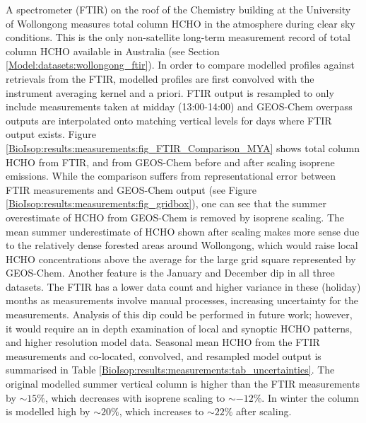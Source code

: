     A spectrometer (FTIR) on the roof of the Chemistry building at the University of Wollongong measures total column HCHO in the atmosphere during clear sky conditions.
    This is the only non-satellite long-term measurement record of total column HCHO available in Australia (see Section \ref{Model:datasets:wollongong_ftir}).
    In order to compare modelled profiles against retrievals from the FTIR, modelled profiles are first convolved with the instrument averaging kernel and a priori. %
    FTIR output is resampled to only include measurements taken at midday (13:00-14:00) and GEOS-Chem overpass outputs are interpolated onto matching vertical levels for days where FTIR output exists.
    Figure \ref{BioIsop:results:measurements:fig_FTIR_Comparison_MYA} shows total column HCHO from FTIR, and from GEOS-Chem before and after scaling isoprene emissions.
    While the comparison suffers from representational error between FTIR measurements and GEOS-Chem output (see Figure \ref{BioIsop:results:measurements:fig_gridbox}), one can see that the summer overestimate of HCHO from GEOS-Chem is removed by isoprene scaling.
    The mean summer underestimate of HCHO shown after scaling makes more sense due to the relatively dense forested areas around Wollongong, which would raise local HCHO concentrations above the average for the large grid square represented by GEOS-Chem.
    Another feature is the January and December dip in all three datasets.
    The FTIR has a lower data count and higher variance in these (holiday) months as measurements involve manual processes, increasing uncertainty for the measurements.
    Analysis of this dip could be performed in future work; however, it would require an in depth examination of local and synoptic HCHO patterns, and higher resolution model data.
    Seasonal mean HCHO from the FTIR measurements and co-located, convolved, and resampled model output is summarised in Table \ref{BioIsop:results:measurements:tab_uncertainties}.
    The original modelled summer vertical column is higher than the FTIR measurements by $\sim{15}\%$, which decreases with isoprene scaling to $\sim{-12}\%$.
    In winter the column is modelled high by $\sim{20}\%$, which increases to $\sim{22}\%$ after scaling.
    
